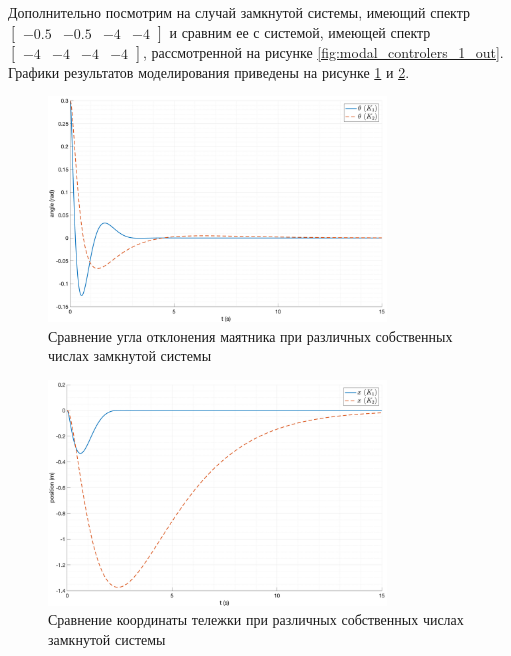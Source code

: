 \FloatBarrier
Дополнительно посмотрим на случай замкнутой системы, имеющий спектр $\begin{bmatrix}-0.5 & -0.5 & -4 &- 4\end{bmatrix}$
и сравним ее с системой, имеющей спектр $\begin{bmatrix}-4 & -4 & -4 &- 4\end{bmatrix}$, рассмотренной на рисунке \ref{fig:modal_controlers_1_out}.
Графики результатов моделирования приведены на рисунке \ref{fig:modal_controlers_ang_cmp_eig} и \ref{fig:modal_controlers_x_cmp_eig}.
\begin{figure}[ht!]
    \centering
    \includegraphics[width=0.8\textwidth]{media/plots/modal_controllers/ang_cmp_eig.png}
    \caption{Сравнение угла отклонения маятника при различных собственных числах замкнутой системы}
    \label{fig:modal_controlers_ang_cmp_eig}
\end{figure}
\begin{figure}[ht!]
    \centering
    \includegraphics[width=0.8\textwidth]{media/plots/modal_controllers/x_cmp_eig.png}
    \caption{Сравнение координаты тележки при различных собственных числах замкнутой системы}
    \label{fig:modal_controlers_x_cmp_eig}
\end{figure}

